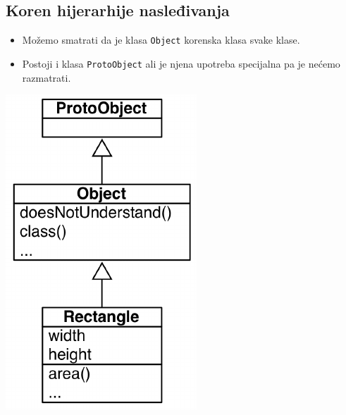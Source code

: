 \documentclass[presentation]{beamer}
\begin{document}
\subsection{Koren hijerarhije nasleđivanja}
\label{sec:org7470c67}

\begin{itemize}
\item Možemo smatrati da je klasa \texttt{Object} korenska klasa svake klase.
\item Postoji i klasa \texttt{ProtoObject} ali je njena upotreba specijalna pa je nećemo
razmatrati.
\end{itemize}
\begin{center}
\includegraphics[width=.9\linewidth]{./slike/hierarchy.png}
\end{center}
\end{document}
